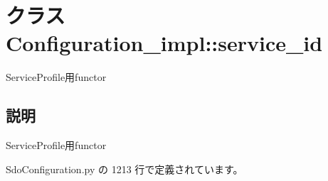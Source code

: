 \section{クラス Configuration\_\-impl::service\_\-id}
\label{classsource__py_1_1_sdo_configuration_1_1_configuration__impl_1_1service__id}
ServiceProfile用functor  




\subsection{説明}
ServiceProfile用functor 

 SdoConfiguration.py の 1213 行で定義されています。